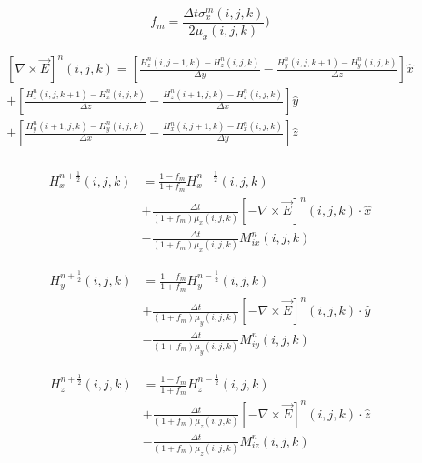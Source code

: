 \documentclass[10pt]{article}
\begin{document}
\begin{equation}
	\boxed{
		f_{m} = \frac{\Delta t \sigma^{m}_{x}(i,j,k)}{2\mu_{x}(i,j,k)} )
	}
\end{equation}


\begin{equation}
	\boxed{
		\begin{aligned}
			\left[\nabla \times \vec{E} \right]^{n}(i,j,k) =
			\left[\frac{H^{n}_{z}(i,j+1,k)-H^{n}_{z}(i,j,k)}{\Delta y}
			-\frac{H^{n}_{y}(i,j,k+1)-H^{n}_{y}(i,j,k)}{\Delta z} \right] \hat{x} \\
			+\left[\frac{H^{n}_{x}(i,j,k+1)-H^{n}_{x}(i,j,k)}{\Delta z}
			-\frac{H^{n}_{z}(i+1,j,k)-H^{n}_{z}(i,j,k)}{\Delta x} \right] \hat{y} \\
			+\left[\frac{H^{n}_{y}(i+1,j,k)-H^{n}_{y}(i,j,k)}{\Delta x}
			-\frac{H^{n}_{x}(i,j+1,k)-H^{n}_{x}(i,j,k)}{\Delta y} \right] \hat{z} \\
		\end{aligned}
	}
\end{equation}


\begin{equation}
	\boxed{
		\begin{aligned}
			H^{n+\frac{1}{2}}_{x}(i,j,k) & = \frac{1-f_m}{1+f_m}  H^{n-\frac{1}{2}}_{x}(i,j,k)                                                    \\
			                             & + \frac{\Delta t}{(1+f_m)\mu_{x}(i,j,k)} \left[ -\nabla\times \vec{E} \right]^{n}(i,j,k) \cdot \hat{x} \\
			                             & - \frac{\Delta t}{(1+f_m)\mu_{x}(i,j,k)} M^{n}_{ix}(i,j,k)
		\end{aligned}
	}
\end{equation}

\begin{equation}
	\boxed{
		\begin{aligned}
			H^{n+\frac{1}{2}}_{y}(i,j,k) & = \frac{1-f_m}{1+f_m}  H^{n-\frac{1}{2}}_{y}(i,j,k)                                                    \\
			                             & + \frac{\Delta t}{(1+f_m)\mu_{y}(i,j,k)} \left[ -\nabla\times \vec{E} \right]^{n}(i,j,k) \cdot \hat{y} \\
			                             & - \frac{\Delta t}{(1+f_m)\mu_{y}(i,j,k)} M^{n}_{iy}(i,j,k)
		\end{aligned}
	}
\end{equation}

\begin{equation}
	\boxed{
		\begin{aligned}
			H^{n+\frac{1}{2}}_{z}(i,j,k) & = \frac{1-f_m}{1+f_m}  H^{n-\frac{1}{2}}_{z}(i,j,k)                                                    \\
			                             & + \frac{\Delta t}{(1+f_m)\mu_{z}(i,j,k)} \left[ -\nabla\times \vec{E} \right]^{n}(i,j,k) \cdot \hat{z} \\
			                             & - \frac{\Delta t}{(1+f_m)\mu_{z}(i,j,k)} M^{n}_{iz}(i,j,k)
		\end{aligned}
	}
\end{equation}
\end{document}
